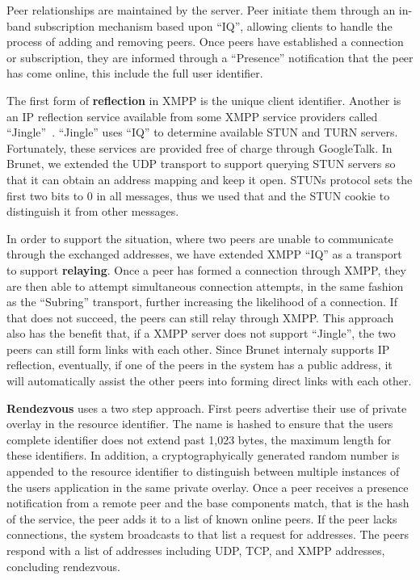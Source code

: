 \documentclass[conference]{IEEEtran}
\begin{document}
Peer relationships are maintained by the server.  Peer initiate them through an
in-band subscription mechanism based upon ``IQ'', allowing clients to handle
the process of adding and removing peers.  Once peers have established a
connection or subscription, they are informed through a ``Presence''
notification that the peer has come online, this include the full user
identifier.

The first form of \textbf{reflection} in XMPP is the unique client identifier.
Another is an IP reflection service available from some XMPP service providers
called ``Jingle''~\cite{jingle}.  ``Jingle'' uses ``IQ'' to determine available
STUN and TURN servers.  Fortunately, these services are provided free of charge
through GoogleTalk.  In Brunet, we extended the UDP transport to support
querying STUN servers so that it can obtain an address mapping and keep it
open.  STUNs protocol sets the first two bits to 0 in all messages, thus we
used that and the STUN cookie to distinguish it from other messages.

In order to support the situation, where two peers are unable to communicate
through the exchanged addresses, we have extended XMPP ``IQ'' as a transport to
support \textbf{relaying}.  Once a peer has formed a connection through XMPP,
they are then able to attempt simultaneous connection attempts, in the same
fashion as the ``Subring'' transport, further increasing the likelihood of a
connection.  If that does not succeed, the peers can still relay through XMPP.
This approach also has the benefit that, if a XMPP server does not support
``Jingle'', the two peers can still form links with each other.  Since Brunet
internaly supports IP reflection, eventually, if one of the peers in the system
has a public address, it will automatically assist the other peers into forming
direct links with each other.

\textbf{Rendezvous} uses a two step approach.  First peers advertise their use
of private overlay in the resource identifier.  The name is hashed to ensure
that the users complete identifier does not extend past 1,023 bytes, the
maximum length for these identifiers.  In addition, a cryptographyically
generated random number is appended to the resource identifier to distinguish
between multiple instances of the users application in the same private
overlay.  Once a peer receives a presence notification from a remote peer and
the base components match, that is the hash of the service, the peer adds it to
a list of known online peers.  If the peer lacks connections, the system
broadcasts to that list a request for addresses.  The peers respond with a list
of addresses including UDP, TCP, and XMPP addresses, concluding rendezvous.
\end{document}
